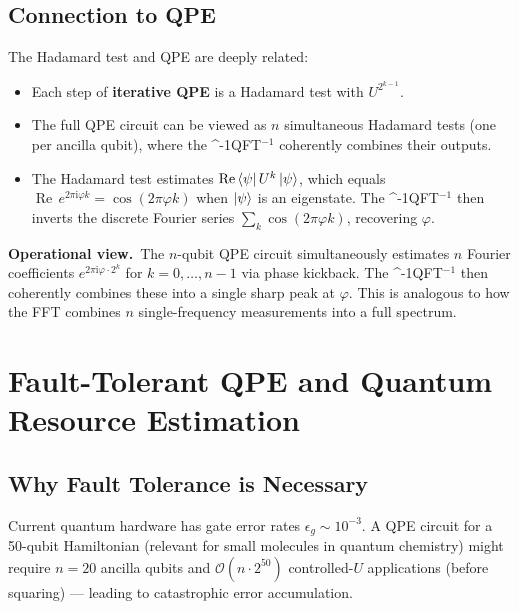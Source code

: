 \documentclass[12pt,a4paper]{article}
\newcommand{\QPE}{\textsc{QPE}}
\newcommand{\IQFT}{\ifmmode \text{\textsc{QFT}}^{-1}\else \textsc{QFT}$^{-1}$\fi}
\newcommand{\ii}{\mathrm{i}}
\newcommand{\bigO}{\mathcal{O}}
\begin{document}
\subsection{Connection to QPE}

The Hadamard test and QPE are deeply related:
\begin{itemize}[leftmargin=*]
  \item Each step of \textbf{iterative QPE} is a Hadamard test with $U^{2^{k-1}}$.
  \item The full \QPE{} circuit can be viewed as $n$ simultaneous Hadamard tests
        (one per ancilla qubit), where the \IQFT{} coherently combines their outputs.
  \item The Hadamard test estimates $\operatorname{Re}\Bra{\psi}U^k\Ket{\psi}$,
        which equals $\operatorname{Re}\,e^{2\pi\ii\varphi k} = \cos(2\pi\varphi k)$
        when $\Ket{\psi}$ is an eigenstate.  The \IQFT{} then inverts the
        discrete Fourier series $\sum_k \cos(2\pi\varphi k)$, recovering $\varphi$.
\end{itemize}

\begin{tcolorbox}[insight]
  \textbf{Operational view.}\ The $n$-qubit \QPE{} circuit simultaneously
  estimates $n$ Fourier coefficients $e^{2\pi\ii\varphi\cdot 2^k}$ for
  $k=0,\ldots,n-1$ via phase kickback.  The \IQFT{} then coherently combines
  these into a single sharp peak at $\varphi$.  This is analogous to how
  the FFT combines $n$ single-frequency measurements into a full spectrum.
\end{tcolorbox}

\newpage

\section{Fault-Tolerant QPE and Quantum Resource Estimation}
\label{app:ft}

\subsection{Why Fault Tolerance is Necessary}

Current quantum hardware has gate error rates $\epsilon_g \sim 10^{-3}$.
A QPE circuit for a 50-qubit Hamiltonian (relevant for small molecules in
quantum chemistry) might require $n=20$ ancilla qubits and $\bigO(n\cdot 2^{50})$
controlled-$U$ applications (before squaring) — leading to catastrophic
error accumulation.
\end{document}
